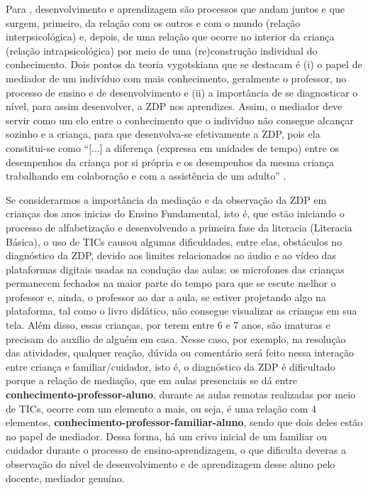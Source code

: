 \documentclass{textolivre}
\begin{document}
Para \textcite{vygotski1991}, desenvolvimento e aprendizagem são processos que andam juntos e que surgem, primeiro, da relação com os outros e com o mundo (relação interpsicológica) e, depois, de uma relação que ocorre no interior da criança (relação intrapsicológica) por meio de uma (re)construção individual do conhecimento. Dois pontos da teoria vygotskiana que se destacam é (i) o papel de mediador de um indivíduo com mais conhecimento, geralmente o professor, no processo de ensino e de desenvolvimento e (ii) a importância de se diagnosticar o nível, para assim desenvolver, a ZDP nos aprendizes. Assim, o mediador deve servir como um elo entre o conhecimento que o indivíduo não consegue alcançar sozinho e a criança, para que desenvolva-se efetivamente a ZDP, pois ela constitui-se como “[...] a diferença (expressa em unidades de tempo) entre os desempenhos da criança por si própria e os desempenhos da mesma criança trabalhando em colaboração e com a assistência de um adulto” \cite[p. 32]{ivic2010}.

Se considerarmos a importância da mediação e da observação da ZDP em crianças dos anos inicias do Ensino Fundamental, isto é, que estão iniciando o processo de alfabetização e desenvolvendo a primeira fase da literacia (Literacia Básica), o uso de TICs causou algumas dificuldades, entre elas, obstáculos no diagnóstico da ZDP, devido aos limites relacionados ao áudio e ao vídeo das plataformas digitais usadas na condução das aulas: os microfones das crianças permanecem fechados na maior parte do tempo para que se escute melhor o professor e, ainda, o professor ao dar a aula, se estiver projetando algo na plataforma, tal como o livro didático, não consegue visualizar as crianças em sua tela. Além disso, essas crianças, por terem entre 6 e 7 anos, são imaturas e precisam do auxílio de alguém em casa. Nesse caso, por exemplo, na resolução das atividades, qualquer reação, dúvida ou comentário será feito nessa interação entre criança e familiar/cuidador, isto é, o diagnóstico da ZDP é dificultado porque a relação de mediação, que em aulas presenciais se dá entre \textbf{conhecimento-professor-aluno}, durante as aulas remotas realizadas por meio de TICs, ocorre com um elemento a mais, ou seja, é uma relação com 4 elementos, \textbf{conhecimento-professor-familiar-aluno}, sendo que dois deles estão no papel de mediador. Dessa forma, há um crivo inicial de um familiar ou cuidador durante o processo de ensino-aprendizagem, o que dificulta deveras a observação do nível de desenvolvimento e de aprendizagem desse aluno pelo docente, mediador genuíno. 
\end{document}
